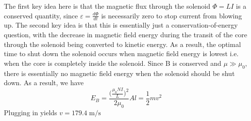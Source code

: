 \begin{solution}
The first key idea here is that the magnetic flux through the solenoid $\Phi = LI$ is a conserved quantity, since $\varepsilon = \frac{d \Phi}{dt}$ is necessarily zero to stop current from blowing up. The second key idea is that this is essentially just a conservation-of-energy question, with the decrease in magnetic field energy during the transit of the core through the solenoid being converted to kinetic energy. As a result, the optimal time to shut down the solenoid occurs when magnetic field energy is lowest i.e. when the core is completely inside the solenoid.
\newline
\newline
Since B is conserved and $\mu \gg \mu_0$, there is essentially no magnetic field energy when the solenoid should be shut down.
As a result, we have
$$E_B = \frac{\bigg (\frac{\mu_0 N I}{L}\bigg )^2}{2 \mu_0}Al = {\frac{1}{2}}mv^2$$
Plugging in yields $\boxed{v = 179.4 \;\mathrm{m/s}}$
\end{solution}